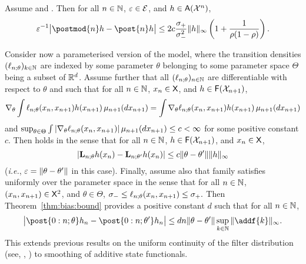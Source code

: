 \begin{corollary} \label{cor:filter:sensitivity}
 Assume  and . Then for all $n \in \mathbb{N}$, $\varepsilon \in \mathcal{E}$, and $h \in \mathsf{A}(\mathcal{X}^n)$,
        $$
        \precpar^{-1} \big| \postmod{n} h -  \post{n} h \big| \leq 2 c \frac{\udup}{\udlow^2}  \| h \|_\infty \left( 1 + \frac{1}{\rho (1 - \rho)} \right).   
    $$
\end{corollary}

\begin{remark}
Consider now a parameterised version of the model, where the transition densities $(\ell_{n ; \theta})_{k \in \mathbb{N}}$ are indexed by some parameter $\theta$ belonging to some parameter space $\Theta$ being a subset of $\mathbb{R}^d$. Assume further that all $(\ell_{n ; \theta})_{n \in \mathbb{N}}$ are differentiable with respect to $\theta$ and such that for all $n \in \mathbb{N}$, $x_n \in \mathsf{X}$, and $h \in \mathsf{F}(\mathcal{X}_{n + 1})$,  
$$
\nabla_\theta \int \ell_{n ; \theta}(x_n, x_{n + 1}) h(x_{n + 1}) \, \mu_{n + 1}(d x_{n + 1}) = \int \nabla_\theta \ell_{n ; \theta}(x_n, x_{n + 1}) h(x_{n + 1}) \, \mu_{n + 1}(d x_{n + 1})
$$
and $\sup_{\theta \in \Theta} \int |\nabla_\theta \ell_{n ; \theta}(x_n, x_{n + 1})| \, \mu_{n + 1}(d x_{n + 1}) \leq c < \infty$ for some positive constant $c$. Then  holds in the sense that for all $n \in \mathbb{N}$, $h \in \mathsf{F}(\mathcal{X}_{n + 1})$, and $x_n \in \mathsf{X}$, 
$$
| \mathbf{L}_{n; \theta}h(x_n) - \mathbf{L}_{n; \theta'}h(x_n) | \leq c \| \theta - \theta' \| \| h \|_\infty
$$
(\emph{i.e.}, $\varepsilon = \| \theta - \theta' \|$ in this case). Finally, assume also that family satisfies  uniformly over the parameter space in the sense that for all $n \in \mathbb{N}$, $(x_n, x_{n + 1}) \in \mathsf{X}^2$, and $\theta \in \Theta$, 
$
\sigma_- \leq \ell_{n; \theta}(x_n, x_{n + 1}) \leq \sigma_+. 
$  
Then Theorem~\ref{thm:bias:bound} provides a positive constant $d$ such that for all $n \in \mathbb{N}$,  
$$
\big| \post{0:n ; \theta} h_n -  \post{0:n ; \theta'} h_n \big|  
\leq d n \| \theta - \theta' \| \sup_{k \in \nset} \| \addf{k} \|_\infty. 
$$
This extends previous results on the uniform continuity of the filter distribution (see, \eg, \cite{papavasiliou:2006,legland:oudjane:2004}) to smoothing of additive state functionals.  
\end{remark}
